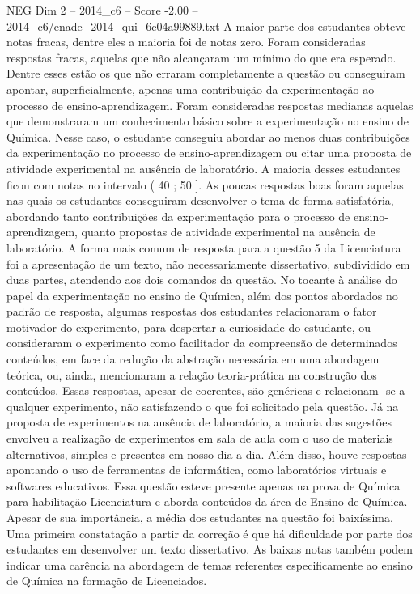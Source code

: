 \begin{textsample}{NEG Dim 2 – 2014\_c6 – Score -2.00 – 2014\_c6/enade\_2014\_qui\_6c04a99889.txt}
A maior parte dos estudantes obteve notas fracas, dentre eles a maioria foi de notas zero.
Foram consideradas respostas fracas, aquelas que não alcançaram um mínimo do que era esperado.
Dentre esses estão os que não erraram completamente a questão ou conseguiram apontar, superficialmente, apenas uma contribuição da experimentação ao processo de ensino-aprendizagem.
Foram consideradas respostas medianas aquelas que demonstraram um conhecimento básico sobre a experimentação no ensino de Química.
Nesse caso, o estudante conseguiu abordar ao menos duas contribuições da experimentação no processo de ensino-aprendizagem ou citar uma proposta de atividade experimental na ausência de laboratório.
A maioria desses estudantes ficou com notas no intervalo ( 40 ; 50 ].
As poucas respostas boas foram aquelas nas quais os estudantes conseguiram desenvolver o tema de forma satisfatória, abordando tanto contribuições da experimentação para o processo de ensino-aprendizagem, quanto propostas de atividade experimental na ausência de laboratório.
A forma mais comum de resposta para a questão 5 da Licenciatura foi a apresentação de um texto, não necessariamente dissertativo, subdividido em duas partes, atendendo aos dois comandos da questão.
No tocante à análise do papel da experimentação no ensino de Química, além dos pontos abordados no padrão de resposta, algumas respostas dos estudantes relacionaram o fator motivador do experimento, para despertar a curiosidade do estudante, ou consideraram o experimento como facilitador da compreensão de determinados conteúdos, em face da redução da abstração necessária em uma abordagem teórica, ou, ainda, mencionaram a relação teoria-prática na construção dos conteúdos.
Essas respostas, apesar de coerentes, são genéricas e relacionam -se a qualquer experimento, não satisfazendo o que foi solicitado pela questão.
Já na proposta de experimentos na ausência de laboratório, a maioria das sugestões envolveu a realização de experimentos em sala de aula com o uso de materiais alternativos, simples e presentes em nosso dia a dia.
Além disso, houve respostas apontando o uso de ferramentas de informática, como laboratórios virtuais e softwares educativos.
Essa questão esteve presente apenas na prova de Química para habilitação Licenciatura e aborda conteúdos da área de Ensino de Química.
Apesar de sua importância, a média dos estudantes na questão foi baixíssima.
Uma primeira constatação a partir da correção é que há dificuldade por parte dos estudantes em desenvolver um texto dissertativo.
As baixas notas também podem indicar uma carência na abordagem de temas referentes especificamente ao ensino de Química na formação de Licenciados.

\end{textsample}
